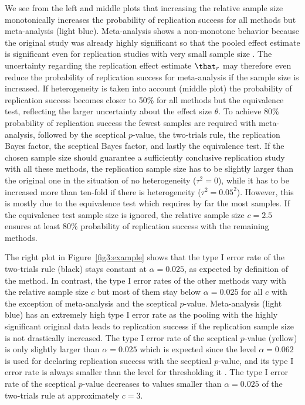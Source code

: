 We see from the left and middle plots that increasing the relative sample size
monotonically increases the probability of replication success for all methods
but meta-analysis (light blue). Meta-analysis shows a non-monotone behavior
because the original study was already highly significant so that the pooled
effect estimate is significant even for replication studies with very small
sample size \citep{Micheloud2020}. The uncertainty regarding the replication
effect estimate $\that_{r}$ may therefore even reduce the probability of
replication success for meta-analysis if the sample size is increased. If
heterogeneity is taken into account (middle plot) the probability of replication
success becomes closer to 50\% for all methods but the equivalence test,
reflecting the larger uncertainty about the effect size $\theta$. To achieve
$80\%$ probability of replication success the fewest
samples are required with meta-analysis, followed by the sceptical $p$-value,
the two-trials rule, the replication Bayes factor, the sceptical Bayes factor,
and lastly the equivalence test. If the chosen sample size should guarantee a
sufficiently conclusive replication study with all these methods, the
replication sample size has to be slightly larger than the original one in the
situation of no heterogeneity ($\tau^{2} = 0$), while it has to be increased
more than ten-fold if there is heterogeneity
($\tau^{2} = 0.05^{2}$). However, this is mostly due to the
equivalence test which requires by far the most samples. If the equivalence test
sample size is ignored, the relative sample size
$c = 2.5$ ensures at least
$80\%$ probability of replication success with the
remaining methods.


The right plot in Figure~\ref{fig3:example} shows that the type I error rate of
the two-trials rule (black) stays constant at
$\alpha = 0.025$, as expected by definition of the method.
In contrast, the type I error rates of the other methods vary with the relative
sample size $c$ but most of them stay below
$\alpha = 0.025$ for all $c$ with the exception of
meta-analysis and the sceptical $p$-value. Meta-analysis (light blue) has an
extremely high type I error rate as the pooling with the highly significant
original data leads to replication success if the replication sample size is not
drastically increased. The type I error rate of the sceptical $p$-value (yellow)
is only slightly larger than $\alpha = 0.025$ which is
expected since the level $\alpha = 0.062$ is used for
declaring replication success with the sceptical $p$-value, and its type I error
rate is always smaller than the level for thresholding it \citep{Held2020}. The
type I error rate of the sceptical $p$-value decreases to values smaller than
$\alpha = 0.025$ of the two-trials rule at approximately
$c = 3$.





